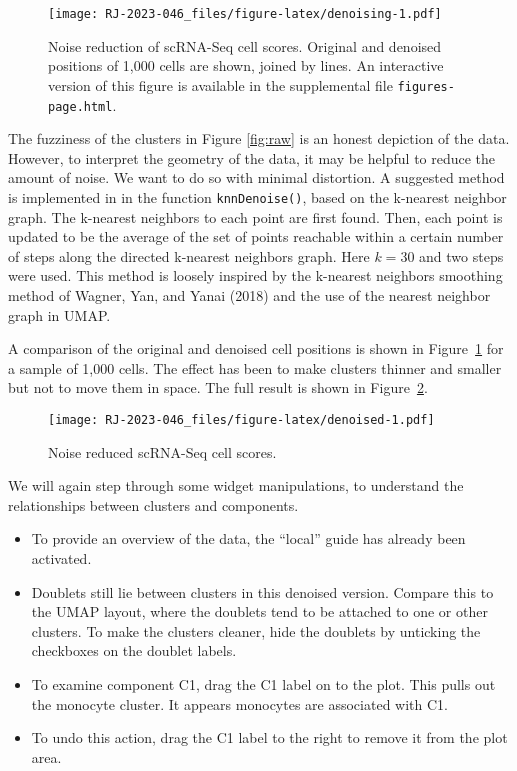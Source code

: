 \begin{figure}
\centering
\texttt{[image: RJ-2023-046\_files/figure-latex/denoising-1.pdf]}
\caption{\label{fig:denoising}Noise reduction of scRNA-Seq cell scores. Original and denoised positions of 1,000 cells are shown, joined by lines. An interactive version of this figure is available in the supplemental file \texttt{figures-page.html}.}
\end{figure}

The fuzziness of the clusters in Figure \ref{fig:raw} is an honest depiction of the data. However, to interpret the geometry of the data, it may be helpful to reduce the amount of noise. We want to do so with minimal distortion. A suggested method is implemented in  in the function \texttt{knnDenoise()}, based on the k-nearest neighbor graph. The k-nearest neighbors to each point are first found. Then, each point is updated to be the average of the set of points reachable within a certain number of steps along the directed k-nearest neighbors graph. Here \(k=30\) and two steps were used. This method is loosely inspired by the k-nearest neighbors smoothing method of Wagner, Yan, and Yanai (2018) and the use of the nearest neighbor graph in UMAP.

A comparison of the original and denoised cell positions is shown in Figure~\ref{fig:denoising} for a sample of 1,000 cells. The effect has been to make clusters thinner and smaller but not to move them in space. The full result is shown in Figure~\ref{fig:denoised}.

\begin{figure}
\centering
\texttt{[image: RJ-2023-046\_files/figure-latex/denoised-1.pdf]}
\caption{\label{fig:denoised}Noise reduced scRNA-Seq cell scores.}
\end{figure}

We will again step through some widget manipulations, to understand the relationships between clusters and components.

\begin{itemize}
\item
  To provide an overview of the data, the ``local'' guide has already been activated.
\item
  Doublets still lie between clusters in this denoised version. Compare this to the UMAP layout, where the doublets tend to be attached to one or other clusters. To make the clusters cleaner, hide the doublets by unticking the checkboxes on the doublet labels.
\item
  To examine component C1, drag the C1 label on to the plot. This pulls out the monocyte cluster. It appears monocytes are associated with C1.
\item
  To undo this action, drag the C1 label to the right to remove it from the plot area.
\end{itemize}

